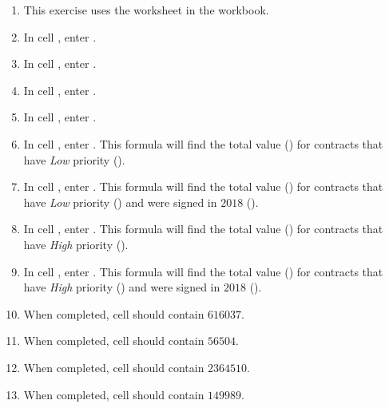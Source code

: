 \begin{enumbox}
	\begin{enumerate}
		\item This exercise uses the  worksheet in the  workbook.
		\item In cell , enter .
		\item In cell , enter .
		\item In cell , enter .
		\item In cell , enter .
		\item In cell , enter . This formula will find the total value () for contracts that have \textit{Low} priority ().
		\item In cell , enter . This formula will find the total value () for contracts that have \textit{Low} priority () and were signed in $ 2018 $ ().
		\item In cell , enter . This formula will find the total value () for contracts that have \textit{High} priority ().
		\item In cell , enter . This formula will find the total value () for contracts that have \textit{High} priority () and were signed in $ 2018 $ ().
		\item When completed, cell  should contain $ 616037 $.
		\item When completed, cell  should contain $ 56504 $.
		\item When completed, cell  should contain $ 2364510 $.
		\item When completed, cell  should contain $ 149989 $.
		

\end{enumerate}
\end{enumbox}
